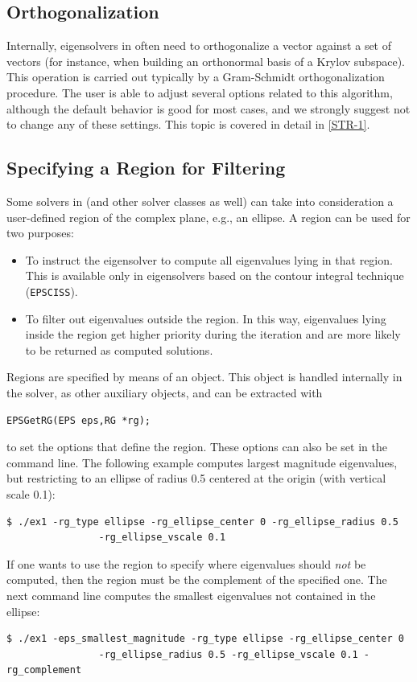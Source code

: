 \subsection{Orthogonalization}
\label{sec:orthog}

	Internally, eigensolvers in  often need to orthogonalize a vector against a set of vectors (for instance, when building an orthonormal basis of a Krylov subspace). This operation is carried out typically by a Gram-Schmidt orthogonalization procedure. The user is able to adjust several options related to this algorithm, although the default behavior is good for most cases, and we strongly suggest not to change any of these settings. This topic is covered in detail in \hyperlink{str}{[STR-1]}.

\subsection{Specifying a Region for Filtering}
\label{sec:region}

Some solvers in  (and other solver classes as well) can take into consideration a user-defined region of the complex plane, e.g., an ellipse. A region can be used for two purposes:
\begin{itemize}
\setlength{\itemsep}{0pt}
\item To instruct the eigensolver to compute all eigenvalues lying in that region. This is available only in eigensolvers based on the contour integral technique (\texttt{EPSCISS}).
\item To filter out eigenvalues outside the region. In this way, eigenvalues lying inside the region get higher priority during the iteration and are more likely to be returned as computed solutions.
\end{itemize}

Regions are specified by means of an  object. This object is handled internally in the  solver, as other auxiliary objects, and can be extracted with
	\begin{Verbatim}[fontsize=\small]
	EPSGetRG(EPS eps,RG *rg);
	\end{Verbatim}
to set the options that define the region. These options can also be set in the command line. The following example computes largest magnitude eigenvalues, but restricting to an ellipse of radius 0.5 centered at the origin (with vertical scale 0.1):
\begin{Verbatim}[fontsize=\footnotesize,numbers=none]
        $ ./ex1 -rg_type ellipse -rg_ellipse_center 0 -rg_ellipse_radius 0.5
                -rg_ellipse_vscale 0.1
\end{Verbatim}
If one wants to use the region to specify where eigenvalues should \emph{not} be computed, then the region must be the complement of the specified one. The next command line computes the smallest eigenvalues not contained in the ellipse:
\begin{Verbatim}[fontsize=\footnotesize,numbers=none]
        $ ./ex1 -eps_smallest_magnitude -rg_type ellipse -rg_ellipse_center 0
                -rg_ellipse_radius 0.5 -rg_ellipse_vscale 0.1 -rg_complement
\end{Verbatim}

